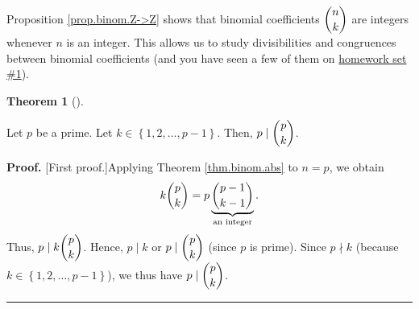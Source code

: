 \documentclass[numbers=enddot,12pt,final,onecolumn,notitlepage]{scrartcl}%
\numberwithin{exer}{subsection}
\theoremstyle{definition}
\newtheorem{theo}{Theorem}[subsection]
\newenvironment{theorem}[1][]
{\begin{theo}[#1]\begin{leftbar}}
{\end{leftbar}\end{theo}}
\newenvironment{proof}[1][Proof]{\noindent\textbf{#1.} }{\ \rule{0.5em}{0.5em}}
\begin{document}
Proposition \ref{prop.binom.Z->Z} shows that binomial coefficients $\dbinom
{n}{k}$ are integers whenever $n$ is an integer. This allows us to study
divisibilities and congruences between binomial coefficients (and you have
seen a few of them on
\href{http://www-users.math.umn.edu/~dgrinber/19s/hw1s.pdf}{homework set \#1}).

\begin{theorem}
\label{thm.binom.p|bin}Let $p$ be a prime. Let $k\in\left\{  1,2,\ldots
,p-1\right\}  $. Then, $p\mid\dbinom{p}{k}$.
\end{theorem}

\begin{proof}
[First proof.]Applying Theorem \ref{thm.binom.abs} to $n=p$, we obtain%
\[
k\dbinom{p}{k}=p\underbrace{\dbinom{p-1}{k-1}}_{\text{an integer}}.
\]
Thus, $p\mid k\dbinom{p}{k}$. Hence, $p\mid k$ or $p\mid\dbinom{p}{k}$ (since
$p$ is prime). Since $p\nmid k$ (because $k\in\left\{  1,2,\ldots,p-1\right\}
$), we thus have $p\mid\dbinom{p}{k}$.
\end{proof}
\end{document}

